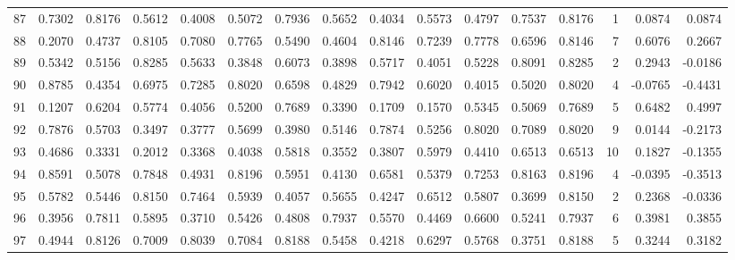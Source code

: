 \begin{tabular}{lrrrrrrrrrrrrrrr}
87  &      0.7302 &  0.8176 &  0.5612 &  0.4008 &  0.5072 &  0.7936 &  0.5652 &  0.4034 &  0.5573 &  0.4797 &   0.7537 &     0.8176 &      1 &                    0.0874 &                     0.0874 \\
88  &      0.2070 &  0.4737 &  0.8105 &  0.7080 &  0.7765 &  0.5490 &  0.4604 &  0.8146 &  0.7239 &  0.7778 &   0.6596 &     0.8146 &      7 &                    0.6076 &                     0.2667 \\
89  &      0.5342 &  0.5156 &  0.8285 &  0.5633 &  0.3848 &  0.6073 &  0.3898 &  0.5717 &  0.4051 &  0.5228 &   0.8091 &     0.8285 &      2 &                    0.2943 &                    -0.0186 \\
90  &      0.8785 &  0.4354 &  0.6975 &  0.7285 &  0.8020 &  0.6598 &  0.4829 &  0.7942 &  0.6020 &  0.4015 &   0.5020 &     0.8020 &      4 &                   -0.0765 &                    -0.4431 \\
91  &      0.1207 &  0.6204 &  0.5774 &  0.4056 &  0.5200 &  0.7689 &  0.3390 &  0.1709 &  0.1570 &  0.5345 &   0.5069 &     0.7689 &      5 &                    0.6482 &                     0.4997 \\
92  &      0.7876 &  0.5703 &  0.3497 &  0.3777 &  0.5699 &  0.3980 &  0.5146 &  0.7874 &  0.5256 &  0.8020 &   0.7089 &     0.8020 &      9 &                    0.0144 &                    -0.2173 \\
93  &      0.4686 &  0.3331 &  0.2012 &  0.3368 &  0.4038 &  0.5818 &  0.3552 &  0.3807 &  0.5979 &  0.4410 &   0.6513 &     0.6513 &     10 &                    0.1827 &                    -0.1355 \\
94  &      0.8591 &  0.5078 &  0.7848 &  0.4931 &  0.8196 &  0.5951 &  0.4130 &  0.6581 &  0.5379 &  0.7253 &   0.8163 &     0.8196 &      4 &                   -0.0395 &                    -0.3513 \\
95  &      0.5782 &  0.5446 &  0.8150 &  0.7464 &  0.5939 &  0.4057 &  0.5655 &  0.4247 &  0.6512 &  0.5807 &   0.3699 &     0.8150 &      2 &                    0.2368 &                    -0.0336 \\
96  &      0.3956 &  0.7811 &  0.5895 &  0.3710 &  0.5426 &  0.4808 &  0.7937 &  0.5570 &  0.4469 &  0.6600 &   0.5241 &     0.7937 &      6 &                    0.3981 &                     0.3855 \\
97  &      0.4944 &  0.8126 &  0.7009 &  0.8039 &  0.7084 &  0.8188 &  0.5458 &  0.4218 &  0.6297 &  0.5768 &   0.3751 &     0.8188 &      5 &                    0.3244 &                     0.3182 \\

\end{tabular}
